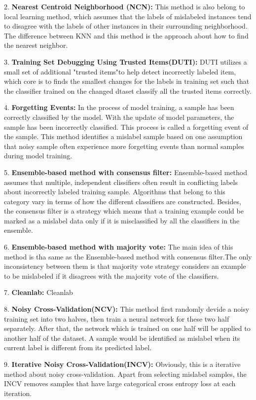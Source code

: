 2. \textbf{Nearest Centroid Neighborhood (NCN):} This method is also belong to local learning method, which assumes that the labels of mislabeled instances tend to disagree with the labels of other instances in their surrounding neighborhood. The difference between KNN and this method is the approach about how to find the nearest neighbor.

3. \textbf{Training Set Debugging Using Trusted Items(DUTI):} DUTI utilizes a small set of additional "trusted items"to help detect incorrectly labeled item, which core is to finds the smallest changes for the labels in training set such that the classifier trained on the changed dtaset classify all the trusted items correctly.

4. \textbf{Forgetting Events:} In the process of model training, a sample has been correctly classified by the model. With the update of model parameters, the sample has been incorrectly classified. This process is called a forgetting event of the sample. This method identifies a mislabel sample based on one assumption that noisy sample often experience more forgetting events than normal samples during model training. 

5. \textbf{Ensemble-based method with consensus filter:}  Ensemble-based method assumes that multiple, independent clissifiers often result in conflicting labels about incorrectly labeled training sample. Algorithms that belong to this category vary in terms of how the different classifiers are constructed. Besides, the consensus filter is a strategy which means that a training example could be marked as a mislabel data only if it is misclassified by all the classifiers in the ensemble.

6. \textbf{Ensemble-based method with majority vote:}  The main idea of this method is tha same as the Ensemble-based method with consensus filter.The only inconsistency between them is that majority vote strategy considers an example to be mislabeled if it disagrees with the majority vote of the classifiers.

7. \textbf{Cleanlab:} Cleanlab 

8. \textbf{Noisy Cross-Validation(NCV):} This method first randomly devide a noisy training set into two halves, then train a neural network for these two half separately. After that, the network which is trained on one half will be applied to another half of the dataset. A sample would be identified as mislabel when its current label is different from its predicted label.

9. \textbf{Iterative Noisy Cross-Validation(INCV):} Obviously, this is a iterative method about noisy cross-validation. Apart from selecting mislabel samples, the INCV removes samples that have large categorical cross entropy loss at each iteration.

